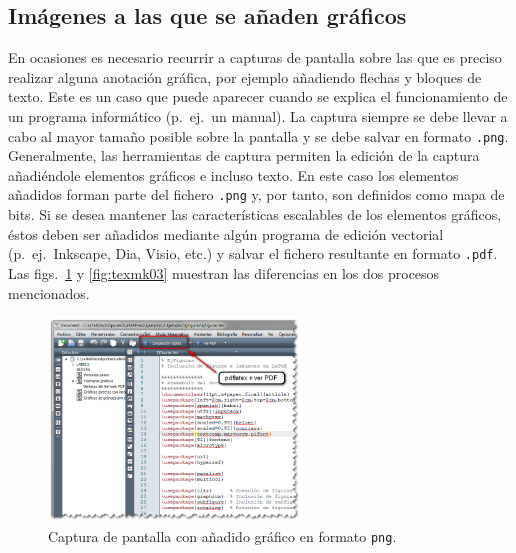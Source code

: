 \documentclass[11pt,a4paper]{article}
\begin{document}
\subsection{Imágenes a las que se añaden gráficos}
En ocasiones es necesario recurrir a capturas de pantalla sobre las que es preciso realizar alguna anotación gráfica, por ejemplo añadiendo flechas y bloques de texto. Este es un caso que puede aparecer cuando se explica el funcionamiento de un programa informático (p.~ej.\ un manual). La captura siempre se debe llevar a cabo al mayor tamaño posible sobre la pantalla y se debe salvar en formato \texttt{.png}. Generalmente, las herramientas de captura permiten la edición de la captura añadiéndole elementos gráficos e incluso texto. En este caso los elementos añadidos 
forman parte del fichero \texttt{.png} y, por tanto, son definidos como mapa de bits. Si se desea mantener las características escalables de los elementos gráficos, éstos deben ser añadidos mediante algún programa de edición vectorial (p.~ej.\ 
\textsf{Inkscape}, \textsf{Dia}, \textsf{Visio}, etc.) y salvar el fichero resultante en formato \texttt{.pdf}. Las figs.~\ref{fig:texmk02} y \ref{fig:texmk03} muestran las diferencias en los dos procesos mencionados.

\begin{figure}[hbt]
	\centering
	\includegraphics[width=0.6\textwidth]{texmk02} 
	\caption[Captura con gráfico en \texttt{png}]{Captura de pantalla con añadido gráfico en formato \texttt{png}.}
	\label{fig:texmk02}
\end{figure}
\end{document}
